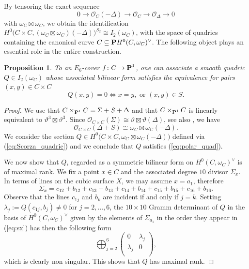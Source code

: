 \documentclass[11pt]{amsart}
\newtheorem{proposition}[theorem]{Proposition}
\theoremstyle{definition}
\def\PP{{\textbf P}}
\def\OO{\mathcal{O}}
\begin{document}
By tensoring the exact sequence 
$$0\longrightarrow \OO_C(-\Delta)\longrightarrow \OO_C\longrightarrow \OO_{\Delta}\longrightarrow 0$$
with $\omega_C\boxtimes \omega_C$, we obtain the identification 
$H^0\bigl(C\times C, (\omega_C\boxtimes \omega_C)(-\Delta)\bigr)^{S_2}\cong I_2(\omega_C)$, with the space of quadrics containing the canonical curve $C\subseteq \PP H^0(C,\omega_C)^{\vee}$. The following object plays an essential role in the entire construction.

\begin{proposition}\label{prop:scorza_quadric}
To an $E_6$-cover $f\colon C\rightarrow \PP^1$, one can associate a smooth quadric $Q\in I_2(\omega_C)$ whose associated bilinear form satisfies the equivalence for pairs $(x,y)\in C\times C$
$$Q(x,y)=0\Longleftrightarrow x=y, \mbox{ or } (x,y)\in S.$$
\end{proposition}
\begin{proof}
We use that $C\times_{\PP^1} C=\Sigma+S+\Delta$ and that $C\times_{\PP^1} C$ is linearly equivalent to $\vartheta^{3}\boxtimes \vartheta^{3}$.
Since $\OO_{C\times C}(\Sigma)\cong \vartheta\boxtimes \vartheta(\Delta)$, see also \cite[Proposition 7.1.5]{DK}, we have 
$$\OO_{C\times C}(\Delta+S)\cong \omega_C\boxtimes \omega_C(-\Delta).$$
We consider the section $Q\in H^0\bigl(C\times C, \omega_C\boxtimes \omega_C(-\Delta)\bigr)$ defined via (\ref{eq:Scorza_quadric}) and we conclude that $Q$ satisfies (\ref{eq:polar_quad}).

\vskip 4pt

We now show that $Q$, regarded as a symmetric bilinear form on $H^0(C, \omega_C)^{\vee}$ is of maximal rank. We fix a point $x\in C$ and the associated degree $10$ divisor $\Sigma_x$. In terms of lines on the cubic 
surface $X$, we may assume $x=a_1$, therefore 
\begin{equation}\label{eq:sx}
\Sigma_x=c_{12}+b_{12}+c_{13}+b_{13}+c_{14}+b_{14}+c_{15}+b_{15}+c_{16}+b_{16}.
\end{equation}
Observe that the lines $c_{1j}$ and $b_k$ are incident if and only if $j=k$. Setting $\lambda_{j}:=Q(c_{1j},b_j)\neq 0$ for $j=2, \ldots, 6$, the $10\times 10$ Gramm determinant of $Q$ in the basis of $H^0(C,\omega_C)^{\vee}$ given by the elements of $\Sigma_{a_1}$ in the order they appear in (\ref{eq:sx}) has then  the following form
$$
\bigoplus_{j=2}^6 \left(\begin{array}{rr}
0& \lambda_j\\
\lambda_j & 0\\
\end{array}
\right),
$$
which is clearly non-singular. This shows that $Q$ has maximal rank.
\end{proof}
\end{document}

